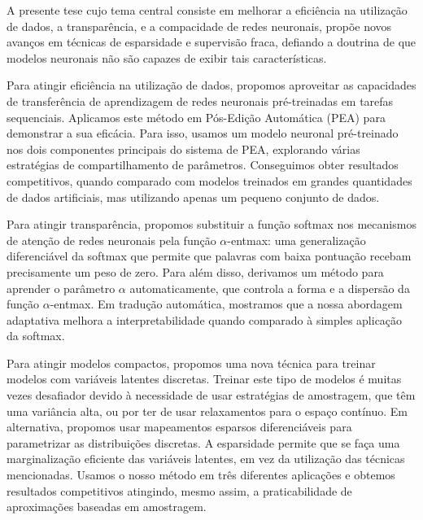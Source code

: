 \begin{resumo}

    A presente tese cujo tema central consiste em melhorar a
    eficiência na utilização de dados, a transparência, e a
    compacidade de redes neuronais, propõe novos avanços em técnicas de
    esparsidade e supervisão fraca, defiando a doutrina de que
    modelos neuronais não são capazes de exibir tais características.

    Para atingir eficiência na utilização de dados, propomos
    aproveitar as capacidades de transferência de aprendizagem de
    redes neuronais pré-treinadas em tarefas sequenciais. Aplicamos
    este método em Pós-Edição Automática (PEA) para demonstrar a sua
    eficácia. Para isso, usamos um modelo neuronal pré-treinado nos
    dois componentes principais do sistema de PEA, explorando várias
    estratégias de compartilhamento de parâmetros. Conseguimos obter
    resultados competitivos, quando comparado com modelos treinados
    em grandes quantidades de dados artificiais, mas utilizando
    apenas um pequeno conjunto de dados.

    Para atingir transparência, propomos substituir a função softmax
    nos mecanismos de atenção de redes neuronais pela função
    $\alpha$-entmax: uma generalização diferenciável da softmax que
    permite que palavras com baixa pontuação recebam precisamente um
    peso de zero. Para além disso, derivamos um método para aprender
    o parâmetro $\alpha$ automaticamente, que controla a forma e a
    dispersão da função $\alpha$-entmax. Em tradução automática,
    mostramos que a nossa abordagem adaptativa melhora a
    interpretabilidade quando comparado à simples aplicação da
    softmax.

    Para atingir modelos compactos, propomos uma nova técnica para
    treinar modelos com variáveis latentes discretas. Treinar este
    tipo de modelos é muitas vezes desafiador devido à necessidade de
    usar estratégias de amostragem, que têm uma variância alta, ou
    por ter de usar relaxamentos para o espaço contínuo. Em
    alternativa, propomos usar mapeamentos esparsos diferenciáveis
    para parametrizar as distribuições discretas. A esparsidade
    permite que se faça uma marginalização eficiente das variáveis
    latentes, em vez da utilização das técnicas mencionadas. Usamos o
    nosso método em três diferentes aplicações e obtemos resultados
    competitivos atingindo, mesmo assim, a praticabilidade de
    aproximações baseadas em amostragem.

\end{resumo}

